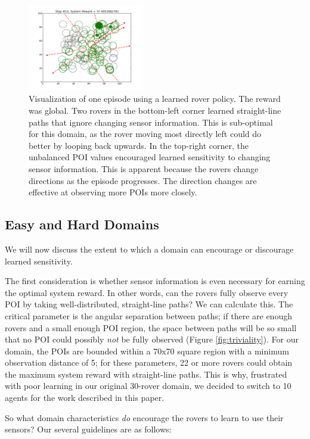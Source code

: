 \documentclass[letterpaper, 10 pt, conference]{ieeeconf}  %
\begin{document}
\begin{figure}[h!]
    \centering
    \includegraphics[width=0.45\textwidth]{GlobalMvt75Eps100POIsBaselineSensor.png}
    \caption{Visualization of one episode using a learned rover policy. The reward was global. Two rovers in the bottom-left corner learned straight-line paths that ignore changing sensor information. This is sub-optimal for this domain, as the rover moving most directly left could do better by looping back upwards. In the top-right corner, the unbalanced POI values encouraged learned sensitivity to changing sensor information. This is apparent because the rovers change directions as the episode progresses. The direction changes are effective at observing more POIs more closely. }
    \label{fig:sensitivity}
\end{figure}


\subsection{Easy and Hard Domains}
We will now discuss the extent to which a domain can encourage or discourage learned sensitivity. 

The first consideration is whether sensor information is even necessary for earning the optimal system reward. In other words, can the rovers fully observe every POI by taking well-distributed, straight-line paths? We can calculate this. The critical parameter is the angular separation between paths; if there are enough rovers and a small enough POI region, the space between paths will be so small that no POI could possibly \emph{not} be fully observed (Figure \ref{fig:triviality}). For our domain, the POIs are bounded within a 70x70 square region with a minimum observation distance of 5; for these parameters, 22 or more rovers could obtain the maximum system reward with straight-line paths. This is why, frustrated with poor learning in our original 30-rover domain, we decided to switch to 10 agents for the work described in this paper.

So what domain characteristics \emph{do} encourage the rovers to learn to use their sensors? Our several guidelines are as follows:
\end{document}
